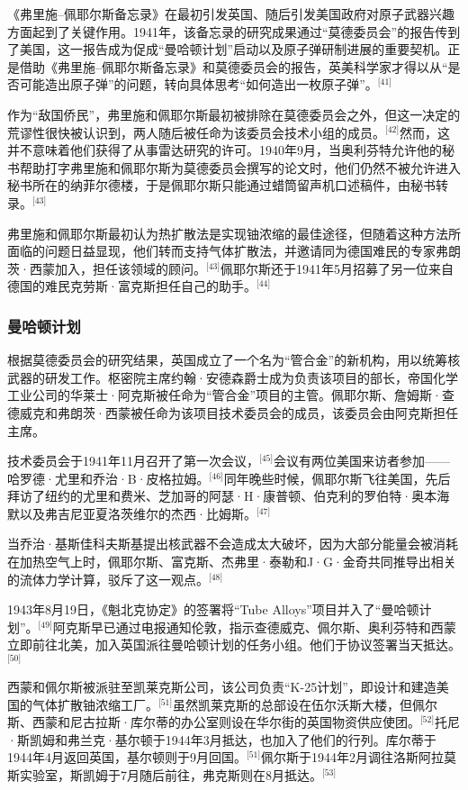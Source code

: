 《弗里施–佩耶尔斯备忘录》在最初引发英国、随后引发美国政府对原子武器兴趣方面起到了关键作用。1941年，该备忘录的研究成果通过“莫德委员会”的报告传到了美国，这一报告成为促成“曼哈顿计划”启动以及原子弹研制进展的重要契机。正是借助《弗里施–佩耶尔斯备忘录》和莫德委员会的报告，英美科学家才得以从“是否可能造出原子弹”的问题，转向具体思考“如何造出一枚原子弹”。\(^\text{[41]}\)

作为“敌国侨民”，弗里施和佩耶尔斯最初被排除在莫德委员会之外，但这一决定的荒谬性很快被认识到，两人随后被任命为该委员会技术小组的成员。\(^\text{[42]}\)然而，这并不意味着他们获得了从事雷达研究的许可。1940年9月，当奥利芬特允许他的秘书帮助打字弗里施和佩耶尔斯为莫德委员会撰写的论文时，他们仍然不被允许进入秘书所在的纳菲尔德楼，于是佩耶尔斯只能通过蜡筒留声机口述稿件，由秘书转录。\(^\text{[43]}\)

弗里施和佩耶尔斯最初认为热扩散法是实现铀浓缩的最佳途径，但随着这种方法所面临的问题日益显现，他们转而支持气体扩散法，并邀请同为德国难民的专家弗朗茨·西蒙加入，担任该领域的顾问。\(^\text{[43]}\)佩耶尔斯还于1941年5月招募了另一位来自德国的难民克劳斯·富克斯担任自己的助手。\(^\text{[44]}\)
\subsubsection{曼哈顿计划}
根据莫德委员会的研究结果，英国成立了一个名为“管合金”的新机构，用以统筹核武器的研发工作。枢密院主席约翰·安德森爵士成为负责该项目的部长，帝国化学工业公司的华莱士·阿克斯被任命为“管合金”项目的主管。佩耶尔斯、詹姆斯·查德威克和弗朗茨·西蒙被任命为该项目技术委员会的成员，该委员会由阿克斯担任主席。

技术委员会于1941年11月召开了第一次会议，\(^\text{[45]}\)会议有两位美国来访者参加——哈罗德·尤里和乔治·B·皮格拉姆。\(^\text{[46]}\)同年晚些时候，佩耶尔斯飞往美国，先后拜访了纽约的尤里和费米、芝加哥的阿瑟·H·康普顿、伯克利的罗伯特·奥本海默以及弗吉尼亚夏洛茨维尔的杰西·比姆斯。\(^\text{[47]}\)

当乔治·基斯佳科夫斯基提出核武器不会造成太大破坏，因为大部分能量会被消耗在加热空气上时，佩耶尔斯、富克斯、杰弗里·泰勒和J·G·金奇共同推导出相关的流体力学计算，驳斥了这一观点。\(^\text{[48]}\)

1943年8月19日，《魁北克协定》的签署将“Tube Alloys”项目并入了“曼哈顿计划”。\(^\text{[49]}\)阿克斯早已通过电报通知伦敦，指示查德威克、佩尔斯、奥利芬特和西蒙立即前往北美，加入英国派往曼哈顿计划的任务小组。他们于协议签署当天抵达。\(^\text{[50]}\)

西蒙和佩尔斯被派驻至凯莱克斯公司，该公司负责“K-25计划”，即设计和建造美国的气体扩散铀浓缩工厂。\(^\text{[51]}\)虽然凯莱克斯的总部设在伍尔沃斯大楼，但佩尔斯、西蒙和尼古拉斯·库尔蒂的办公室则设在华尔街的英国物资供应使团。\(^\text{[52]}\)托尼·斯凯姆和弗兰克·基尔顿于1944年3月抵达，也加入了他们的行列。库尔蒂于1944年4月返回英国，基尔顿则于9月回国。\(^\text{[51]}\)佩尔斯于1944年2月调往洛斯阿拉莫斯实验室，斯凯姆于7月随后前往，弗克斯则在8月抵达。\(^\text{[53]}\)

